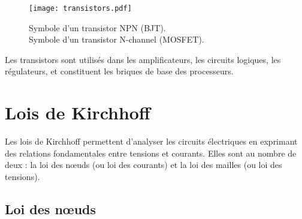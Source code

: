 \begin{figure}[H]
    \centering
    \texttt{[image: transistors.pdf]}
    \caption{\centering\newline
         Symbole d’un transistor NPN (BJT).\\
         Symbole d’un transistor N-channel (MOSFET).
    }
\end{figure}

Les transistors sont utilisés dans les amplificateurs,
les circuits logiques, les régulateurs, et constituent les briques de base des processeurs.

\section{Lois de Kirchhoff} \label{subsec:kirchhoff}
Les lois de Kirchhoff permettent d’analyser les circuits électriques en exprimant
des relations fondamentales entre tensions et courants. Elles sont au nombre de deux :
la loi des nœuds (ou loi des courants) et la loi des mailles (ou loi des tensions).
\subsection{Loi des n{\oe}uds} \label{subsec:noeuds}
\begin{figure}[H]
    \centering
\end{figure}

